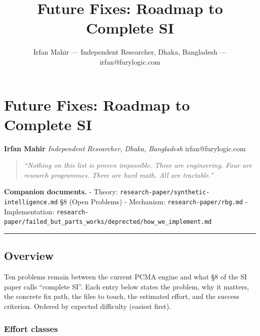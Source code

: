\documentclass[
  11pt,
  a4paper,
]{article}
\title{Future Fixes: Roadmap to Complete SI}
\author{Irfan Mahir --- Independent Researcher, Dhaka, Bangladesh ---
irfan@furylogic.com}
\date{}
\begin{document}
\maketitle

{
\hypersetup{linkcolor=}
\setcounter{tocdepth}{3}
\tableofcontents
}
\section{Future Fixes: Roadmap to Complete
SI}\label{future-fixes-roadmap-to-complete-si}

\textbf{Irfan Mahir} \emph{Independent Researcher, Dhaka, Bangladesh}
irfan@furylogic.com

\begin{quote}
\emph{``Nothing on this list is proven impossible. Three are
engineering. Four are research programmes. Three are hard math. All are
tractable.''}
\end{quote}

\textbf{Companion documents.} - Theory:
\texttt{research-paper/synthetic-intelligence.md} §8 (Open Problems) -
Mechanism: \texttt{research-paper/rbg.md} - Implementation:
\texttt{research-paper/failed\_but\_parts\_works/deprected/how\_we\_implement.md}

\begin{center}\rule{0.5\linewidth}{0.5pt}\end{center}

\subsection{Overview}\label{overview}

Ten problems remain between the current PCMA engine and what §8 of the
SI paper calls ``complete SI''. Each entry below states the problem, why
it matters, the concrete fix path, the files to touch, the estimated
effort, and the success criterion. Ordered by expected difficulty
(easiest first).

\subsubsection{Effort classes}\label{effort-classes}
\end{document}
